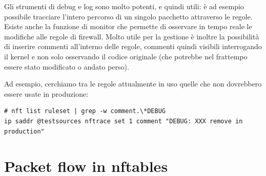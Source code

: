 Gli strumenti di debug e log sono molto potenti, e quindi utili: \`e ad
esempio possibile tracciare l'intero percorso di un singolo pacchetto
attraverso le regole.  Esiste anche la funzione di monitor che permette di
osservare in tempo reale le modifiche alle regole di firewall.
Molto utile per la gestione è inoltre la possibilità di inserire commenti
all'interno delle regole, commenti quindi visibili interrogando il kernel e non
solo osservando il codice originale (che potrebbe nel frattempo essere stato 
modificato o andato perso).

Ad esempio, cerchiamo tra le regole attualmente in uso quelle che non
dovrebbero essere usate in produzione:
\begin{lstlisting}[style=customb]
# nft list ruleset | grep -w comment.\*DEBUG
ip saddr @testsources nftrace set 1 comment "DEBUG: XXX remove in production"
\end{lstlisting}

\section{Packet flow in nftables}

